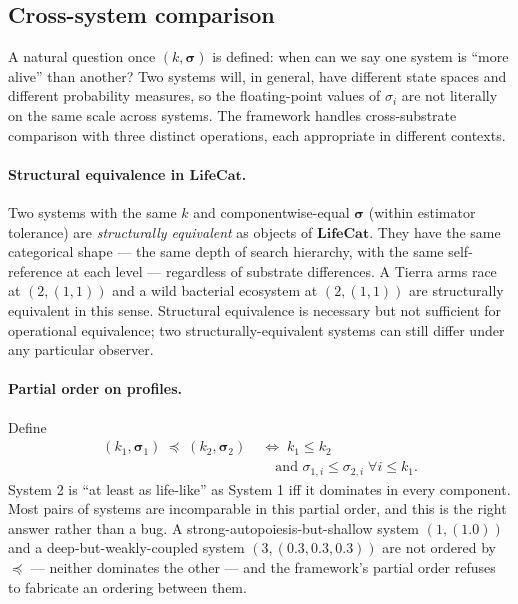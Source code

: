 \documentclass[journal]{IEEEtran}
\theoremstyle{plain}
\theoremstyle{definition}
\theoremstyle{plain}
\begin{document}
\subsection{Cross-system comparison}\label{sec:comparison}

A natural question once $(k, \boldsymbol{\sigma})$ is defined: when can
we say one system is ``more alive'' than another? Two systems will, in
general, have different state spaces and different probability measures,
so the floating-point values of $\sigma_i$ are not literally on the
same scale across systems. The framework handles cross-substrate
comparison with three distinct operations, each appropriate in
different contexts.

\paragraph{Structural equivalence in $\mathbf{LifeCat}$.} Two systems
with the same $k$ and componentwise-equal $\boldsymbol{\sigma}$ (within
estimator tolerance) are \emph{structurally equivalent} as objects of
$\mathbf{LifeCat}$. They have the same categorical shape --- the same
depth of search hierarchy, with the same self-reference at each level
--- regardless of substrate differences. A Tierra arms race at
$(2, (1, 1))$ and a wild bacterial ecosystem at $(2, (1, 1))$ are
structurally equivalent in this sense. Structural equivalence is
necessary but not sufficient for operational equivalence; two
structurally-equivalent systems can still differ under any particular
observer.

\paragraph{Partial order on profiles.} Define
\[
  \begin{aligned}
    (k_1, \boldsymbol{\sigma}_1) \;\preceq\; (k_2, \boldsymbol{\sigma}_2)
    \;&\iff\; k_1 \leq k_2 \\
    &\quad \text{and } \sigma_{1,i} \leq \sigma_{2,i} \;\forall i \leq k_1.
  \end{aligned}
\]
System 2 is ``at least as life-like'' as System 1 iff it dominates in
every component. Most pairs of systems are incomparable in this partial
order, and this is the right answer rather than a bug. A
strong-autopoiesis-but-shallow system $(1, (1.0))$ and a
deep-but-weakly-coupled system $(3, (0.3, 0.3, 0.3))$ are not
ordered by $\preceq$ --- neither dominates the other --- and the
framework's partial order refuses to fabricate an ordering between
them.
\end{document}
